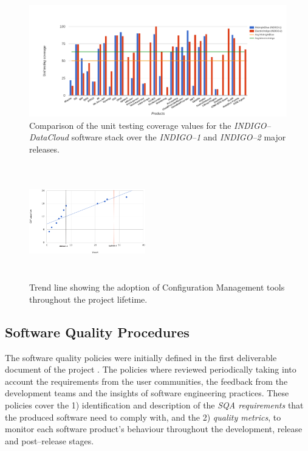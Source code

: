 \documentclass[journal]{IEEEtran}
\begin{document}
\begin{figure}[ht]
\centering
\includegraphics[width=\textwidth]{images/unittest.png}
\caption{Comparison of the unit testing coverage values for the {\sl INDIGO--DataCloud} software stack over the {\sl INDIGO--1} and {\sl INDIGO--2} major releases.}
\label{fig:fig_unittest}
\end{figure}

\begin{figure}[ht]
\centering
\includegraphics[width=0.45\textwidth, height=50mm]{images/confman.png}
\caption{Trend line showing the adoption of Configuration Management tools throughout the project lifetime.}
\label{fig:fig_confman}
\end{figure}

\subsection{Software Quality Procedures}
\label{subsec:sqa}

The software quality policies were initially defined in the first deliverable document of the
project \cite{indigo-d31}. The policies where reviewed periodically taking into account the requirements
from the user communities, the feedback from the development teams and the insights of software engineering practices. These policies cover the 1) identification
and description of the \emph{SQA requirements} that the produced software need
to comply with, and the 2) \emph{quality metrics}, to monitor each software product's
behaviour throughout the development, release and post--release stages.
\end{document}

